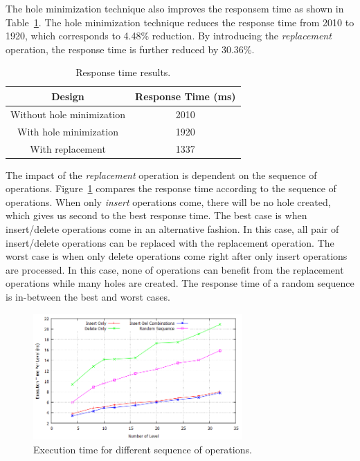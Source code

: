The hole minimization technique also improves the responsem time as shown in Table~\ref{table3}.
The hole minimization technique reduces the response time from 2010 to 1920, which corresponds to 4.48\% reduction.
By introducing the {\it replacement} operation, the response time is further reduced by 30.36\%.

\begin{table}
 \begin{center}
 \caption{Response time results.}
\label{table3}
\begin{tabular}{ |c|c|}
 \hline
 Design  &  Response Time (ms) \\
 \hline
Without hole minimization & 2010 \\
  \hline
With hole minimization & 1920 \\
  \hline
With replacement & 1337 \\
  \hline
\end{tabular}
\end{center}
\end{table}

The impact of the {\it replacement} operation is dependent on the sequence of operations.
Figure~\ref{random} compares the response time according to the sequence of operations.
When only {\it insert} operations come, there will be no hole created, which gives us second to the best response time.
The best case is when insert/delete operations come in an alternative fashion.
In this case, all pair of insert/delete operations can be replaced with the replacement operation.
The worst case is when only delete operations come right after only insert operations are processed.
In this case, none of operations can benefit from the replacement operations while many holes are created.
The response time of a random sequence is in-between the best and worst cases.

\begin{figure}[!ht]
  \centering
  \includegraphics[width=8.0cm]{Figures/random.png}
      \caption{Execution time for different sequence of operations.}
    \label{random}
\end{figure}

